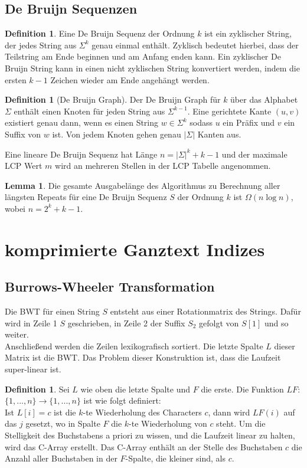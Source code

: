 \documentclass[a4paper, 12pt]{article}
\theoremstyle{plain}
\theoremstyle{definition}
\newtheorem{definition}[theorem]{Definition} %
\theoremstyle{lemma}
\newtheorem{lemma}[theorem]{Lemma}
\theoremstyle{remark}
\theoremstyle{corollary}
\theoremstyle{example}
\begin{document}
	\subsection{De Bruijn Sequenzen}
	\begin{definition}
		Eine De Bruijn Sequenz der Ordnung $k$ ist ein zyklischer String, der jedes String aus $\Sigma^k$ genau einmal enthält. Zyklisch bedeutet hierbei, dass der Teilstring am Ende beginnen und am Anfang enden kann. Ein zyklischer De Bruijn String kann in einen nicht zyklischen String konvertiert werden, indem die ersten $k-1$ Zeichen wieder am Ende angehängt werden.
	\end{definition}
	\begin{definition}[De Bruijn Graph]
		Der De Bruijn Graph für $k$ über das Alphabet $\Sigma$ enthält einen Knoten für jeden String aus $\Sigma^{k-1}$. Eine gerichtete Kante $(u,v)$ existiert genau dann, wenn es einen String $w \in \Sigma^k$ sodass $u$ ein Präfix und $v$ ein Suffix von $w$ ist. Von jedem Knoten gehen genau $\left|\Sigma\right|$ Kanten aus.
	\end{definition}
	Eine lineare De Bruijn Sequenz hat Länge $n=\left|\Sigma\right|^k+k-1$ und der maximale LCP Wert $m$ wird an mehreren Stellen in der LCP Tabelle angenommen. 
	\begin{lemma}
		Die gesamte Ausgabelänge des Algorithmus zu Berechnung aller längsten Repeats für eine De Bruijn Sequenz $S$ der Ordnung $k$ ist $\Omega(n\log n)$, wobei $n = 2^k+k-1$.
	\end{lemma}
\section{komprimierte Ganztext Indizes}
	\subsection{Burrows-Wheeler Transformation}
	Die BWT für einen String $S$ entsteht aus einer Rotationmatrix des Strings. Dafür wird in Zeile 1 $S$ geschrieben, in Zeile 2 der Suffix $S_2$ gefolgt von $S[1]$ und so weiter.\\
	Anschließend werden die Zeilen lexikografisch sortiert. Die letzte Spalte $L$ dieser Matrix ist die BWT. Das Problem dieser Konstruktion ist, dass die Laufzeit super-linear ist.
	\begin{definition}
		Sei $L$ wie oben die letzte Spalte und $F$ die erste.
		Die Funktion $LF$: $\{1,...,n\} \to \{1,...,n\}$ ist wie folgt definiert:\\
		Ist $L[i] = c$ ist die $k$-te Wiederholung des Characters $c$, dann wird $LF(i)$ auf das $j$ gesetzt, wo in Spalte $F$ die $k$-te Wiederholung von $c$ steht. Um die Stelligkeit des Buchstabens a priori zu wissen, und die Laufzeit linear zu halten, wird das C-Array erstellt. Das C-Array enthält an der Stelle des Buchstaben $c$ die Anzahl aller Buchstaben in der $F$-Spalte, die kleiner sind, als $c$.
	\end{definition}
\end{document}
